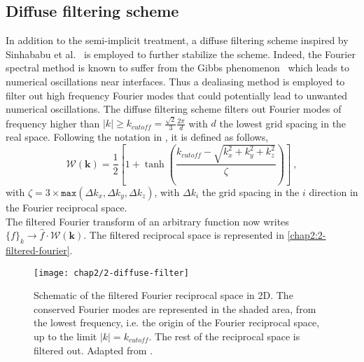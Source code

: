 \subsection{Diffuse filtering scheme}
    In addition to the semi-implicit treatment, a diffuse filtering scheme inspired by Sinhababu et al.\ \cite{SinhababuBhattacharya2022} is employed to further stabilize the scheme. Indeed, the Fourier spectral method is known to suffer from the Gibbs phenomenon\ \cite{SircaHorvat2012, Fornberg1996} which leads to numerical oscillations near interfaces. Thus a dealiasing method is employed to filter out high frequency Fourier modes that could potentially lead to unwanted numerical oscillations.
    The diffuse filtering scheme filters out Fourier modes of frequency higher than $|k| \geq k_{cutoff} = \frac{\sqrt{2}}{3} \frac{2\pi}{d}$ with $d$ the lowest grid spacing in the real space.
    Following the notation in \cite{SinhababuBhattacharya2022}, it is defined as follows,
    \begin{equation}
        \mathcal{W}(\mathbf{k}) = \frac{1}{2}\left[1+\tanh{\left(\frac{k_{cutoff} - \sqrt{k_x^2 + k_y^2 + k_z^2}}{\zeta}\right)}\right]\ ,
    \end{equation}
    with $\zeta = 3\times\texttt{max}(\Delta k_x, \Delta k_y, \Delta k_z)$, with $\Delta k_i$ the grid spacing in the $i$ direction in the Fourier reciprocal space.\\
    The filtered Fourier transform of an arbitrary function now writes $\{f\}_k\rightarrow \hat{f} \cdot \mathcal{W}(\mathbf{k})$. The filtered reciprocal space is represented in \autoref{chap2:2-filtered-fourier}.
    \begin{figure}[H]
        \centering
        \texttt{[image: chap2/2-diffuse-filter]}
        \caption{Schematic of the filtered Fourier reciprocal space in 2D. The conserved Fourier modes are represented in the shaded area, from the lowest frequency, i.e. the origin of the Fourier reciprocal space, up to the limit $|k| = k_{cutoff}$. The rest of the reciprocal space is filtered out. Adapted from \cite{SinhababuBhattacharya2022}.}
        \label{chap2:2-filtered-fourier}
    \end{figure}
